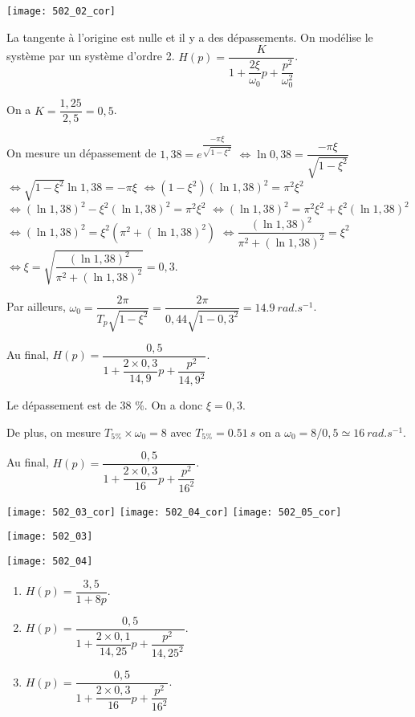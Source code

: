\ifprof
\begin{marginfigure}
\texttt{[image: 502\_02\_cor]}
\end{marginfigure}

La tangente à l'origine est nulle et il y a des dépassements. On modélise le système par un système d'ordre 2. 
$H(p)=\dfrac{K}{1+\dfrac{2\xi}{\omega_0}p+\dfrac{p^2}{\omega_0^2}}$.

On a $K= \dfrac{1,25}{2,5}=0,5$.


On mesure un dépassement de 
$1,38 = e^{\dfrac{-\pi \xi}{\sqrt{1-\xi^2}}}$
$\Leftrightarrow \ln 0,38 = \dfrac{-\pi \xi}{\sqrt{1-\xi^2}}$
$\Leftrightarrow \sqrt{1-\xi^2} \ln 1,38 = -\pi \xi$
$\Leftrightarrow (1-\xi^2) (\ln 1,38)^2= \pi^2 \xi^2$
$\Leftrightarrow (\ln 1,38)^2-\xi^2(\ln 1,38)^2 = \pi^2 \xi^2$
$\Leftrightarrow (\ln 1,38)^2 = \pi^2 \xi^2 + \xi^2(\ln 1,38)^2$
$\Leftrightarrow (\ln 1,38)^2 =\xi^2 \left(\pi^2  + (\ln 1,38)^2\right)$
$\Leftrightarrow \dfrac{(\ln 1,38)^2}{\pi^2  + (\ln 1,38)^2} =\xi^2 $
$\Leftrightarrow \xi = \sqrt{\dfrac{(\ln 1,38)^2}{\pi^2  +(\ln 1,38)^2}} =0,3 $.


Par ailleurs, $\omega_0 = \dfrac{2\pi }{T_p \sqrt{1-\xi^2}} =\dfrac{2\pi }{0,44 \sqrt{1-0,3^2}} = \SI{14,9}{rad.s^{-1}}$.

Au final, $H(p)=\dfrac{0,5}{1+\dfrac{2\times 0,3}{14,9}p+\dfrac{p^2}{14,9^2}}$.


\else
\fi



\ifprof
Le dépassement est de 38 \%. On a donc $\xi = 0,3$.

De plus, on mesure $T_{5\%}\times \omega_0 =8$ avec $T_{5\%}=\SI{0,51}{s}$ on a $\omega_0 = 8/0,5 \simeq \SI{16}{rad.s^{-1}}$.

Au final, $H(p)=\dfrac{0,5}{1+\dfrac{2\times 0,3}{16}p+\dfrac{p^2}{16^2}}$.
\begin{center}
\texttt{[image: 502\_03\_cor]}
\texttt{[image: 502\_04\_cor]}
\texttt{[image: 502\_05\_cor]}
\end{center}
\else
\begin{marginfigure}
\texttt{[image: 502\_03]}
\end{marginfigure}
\begin{marginfigure}
\texttt{[image: 502\_04]}
\end{marginfigure}
\fi


\ifprof
\else
\begin{solution}
\begin{enumerate}
\item  $H(p)=\dfrac{3,5}{1+8p}$.
\item $H(p)=\dfrac{0,5}{1+\dfrac{2\times 0,1}{14,25}p+\dfrac{p^2}{14,25^2}}$.
\item $H(p)=\dfrac{0,5}{1+\dfrac{2\times 0,3}{16}p+\dfrac{p^2}{16^2}}$.
\end{enumerate}
\end{solution}


\fi